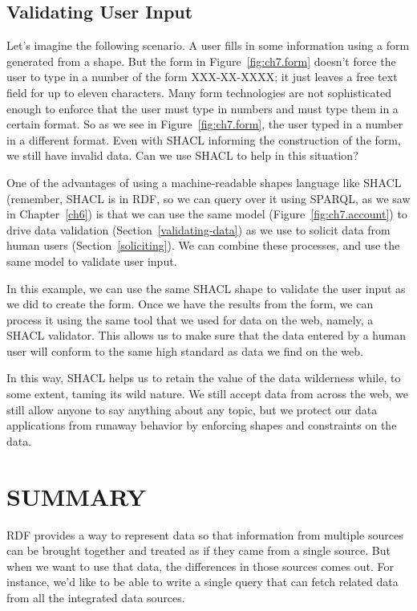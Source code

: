 \subsection{Validating User Input}\label{vuser}

Let's imagine the following scenario.  A user fills in some information using a form generated
from a shape.  But the form in Figure~\ref{fig:ch7.form} doesn't force the user 
to type in a number of the form XXX-XX-XXXX; it just leaves a free text field for 
up to eleven characters.  Many form technologies are not sophisticated enough to 
enforce that the user must type in numbers and must type them in a certain format.  
So as we see in Figure~\ref{fig:ch7.form}, the user typed in a number in a different format. 
Even with SHACL informing the construction of the form, we still have invalid data.   Can 
we use SHACL to help in this situation? 

One of the advantages of using a machine-readable shapes language like
SHACL (remember, SHACL is in RDF, so we can query over it using
SPARQL, as we saw in Chapter~\ref{ch6}) is that we can use the same
model (Figure~\ref{fig:ch7.account}) to drive data validation
(Section~\ref{validating-data}) as we use to solicit data from human
users (Section~\ref{soliciting}).  We can combine these processes, and
use the same model to validate user input.

In this example, we can use the same SHACL shape to validate the user input
as we did to create the form. 
Once we have the results from the form, we can process it using the
same tool that we used for data on the web, namely, a SHACL
validator. This allows us to make sure that the data entered by a
human user will conform to the same high standard as data we find on
the web.  

In this way, SHACL helps us to retain the value of the data wilderness
while, to some extent, taming its wild nature.  We still accept data
from across the web, we still allow anyone to say anything about any
topic, but we protect our data applications from runaway behavior by
enforcing shapes and constraints on the data.


\section{SUMMARY}

RDF provides a way to represent data so that information from multiple
sources can be brought together and treated as if they came from a
single source. But when we want to use that data, the differences in
those sources comes out. For instance, we'd like to be able to write a
single query that can fetch related data from all the integrated data
sources.

